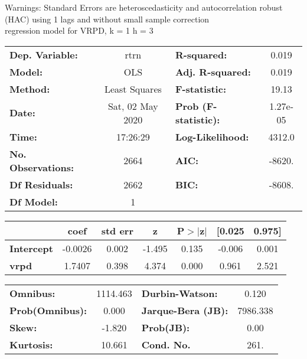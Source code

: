 Warnings: \newline
 [1] Standard Errors are heteroscedasticity and autocorrelation robust (HAC) using 1 lags and without small sample correction\\ 

regression model for VRPD, k = 1 h = 3\begin{center}
\begin{tabular}{lclc}
\toprule
\textbf{Dep. Variable:}    &       rtrn       & \textbf{  R-squared:         } &     0.019   \\
\textbf{Model:}            &       OLS        & \textbf{  Adj. R-squared:    } &     0.019   \\
\textbf{Method:}           &  Least Squares   & \textbf{  F-statistic:       } &     19.13   \\
\textbf{Date:}             & Sat, 02 May 2020 & \textbf{  Prob (F-statistic):} &  1.27e-05   \\
\textbf{Time:}             &     17:26:29     & \textbf{  Log-Likelihood:    } &    4312.0   \\
\textbf{No. Observations:} &        2664      & \textbf{  AIC:               } &    -8620.   \\
\textbf{Df Residuals:}     &        2662      & \textbf{  BIC:               } &    -8608.   \\
\textbf{Df Model:}         &           1      & \textbf{                     } &             \\
\bottomrule
\end{tabular}
\begin{tabular}{lcccccc}
                   & \textbf{coef} & \textbf{std err} & \textbf{z} & \textbf{P$> |$z$|$} & \textbf{[0.025} & \textbf{0.975]}  \\
\midrule
\textbf{Intercept} &      -0.0026  &        0.002     &    -1.495  &         0.135        &       -0.006    &        0.001     \\
\textbf{vrpd}      &       1.7407  &        0.398     &     4.374  &         0.000        &        0.961    &        2.521     \\
\bottomrule
\end{tabular}
\begin{tabular}{lclc}
\textbf{Omnibus:}       & 1114.463 & \textbf{  Durbin-Watson:     } &    0.120  \\
\textbf{Prob(Omnibus):} &   0.000  & \textbf{  Jarque-Bera (JB):  } & 7986.338  \\
\textbf{Skew:}          &  -1.820  & \textbf{  Prob(JB):          } &     0.00  \\
\textbf{Kurtosis:}      &  10.661  & \textbf{  Cond. No.          } &     261.  \\
\bottomrule
\end{tabular}
\end{center}

